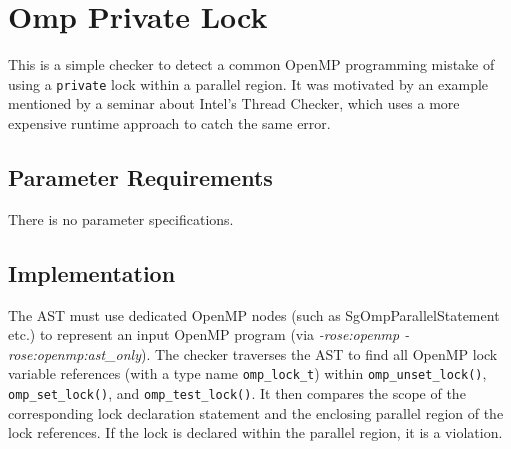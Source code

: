 %
%

\section{Omp Private Lock}
\label{OmpPrivateLock::overview}
This is a simple checker to detect a common OpenMP programming mistake of
using a \lstinline{private} lock within a parallel region.
It was motivated by an example mentioned by a seminar about Intel's
Thread Checker, which uses a more expensive runtime approach to catch the
same error.

\subsection{Parameter Requirements}

There is no parameter specifications.

\subsection{Implementation}

The AST must use  dedicated OpenMP nodes
(such as SgOmpParallelStatement etc.) to represent an input OpenMP program
(via \textit{-rose:openmp -rose:openmp:ast\_only}).
The checker traverses the AST to find all OpenMP lock variable references
(with a type name \lstinline{omp_lock_t})
within \lstinline{omp_unset_lock()}, \lstinline{omp_set_lock()}, and
\lstinline{omp_test_lock()}.
It then compares the scope of the corresponding lock declaration statement
and the enclosing parallel region of the lock references. 
If the lock is declared within the parallel region, it is a violation. 

